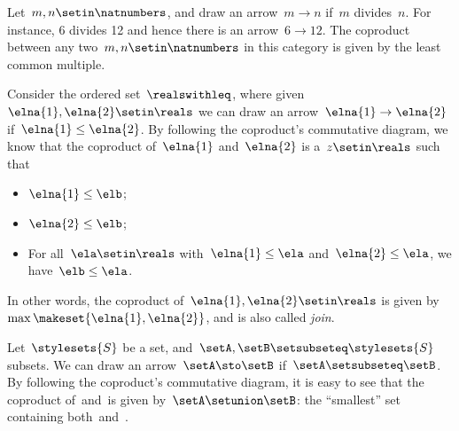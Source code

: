 \begin{example}
    Let~$m,n\setin \natnumbers$, and draw an arrow~$m\to n$ if~$m$ divides~$n$.
    For instance, 6 divides 12 and hence there is an arrow~$6\to 12$.
    The coproduct between any two~$m,n\setin \natnumbers$ in this category is given by the least common multiple.
\end{example}

\begin{example}
    Consider the ordered set~$\realswithleq$, where given~$\elna{1},\elna{2}\setin \reals$ we can draw an arrow~$\elna{1}\to \elna{2}$ if~$\elna{1}\leq \elna{2}$.
    By following the coproduct's commutative diagram, we know that the coproduct of~$\elna{1}$ and~$\elna{2}$ is a~$z\setin \reals$ such that
    \begin{itemize}
        \item $\elna{1}\leq \elb$;
        \item $\elna{2}\leq \elb$;
        \item For all~$\ela\setin \reals$ with~$\elna{1}\leq \ela$ and~$\elna{2}\leq \ela$, we have~$\elb\leq \ela$.
    \end{itemize}
    In other words, the coproduct of~$\elna{1},\elna{2}\setin \reals$ is given by~$\max\makeset{\elna{1},\elna{2}}$, and is also called \emph{join}.
\end{example}

\begin{example}
    \label{ex:subset_coprod}
    Let~$\stylesets{S}$ be a set, and~$\setA,\setB\setsubseteq \stylesets{S}$ subsets.
    We can draw an arrow~$\setA \sto \setB$ if~$\setA\setsubseteq \setB$.
    By following the coproduct's commutative diagram, it is easy to see that the coproduct of~\setA and~\setB is given by~$\setA\setunion\setB$: the ``smallest'' set containing both~\setA and~\setB.
\end{example}

